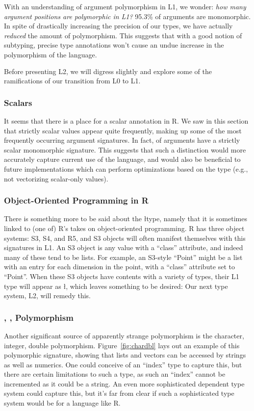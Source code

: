 \documentclass[acmsmall,10pt,review,anonymous]{acmart}\settopmatter{printfolios=true,printccs=false,printacmref=false}
\begin{document}
With an understanding of argument polymorphism in L1, we wonder: {\it how
  many argument positions are polymorphic in L1?}  95.3\% of arguments are
monomorphic.  In spite of drastically increasing the precision of our types,
we have actually {\it reduced} the amount of polymorphism.  This suggests
that with a good notion of subtyping, precise type annotations won't cause
an undue increase in the polymorphism of the language.

Before presenting L2, we will digress slightly and explore some of the ramifications of our transition from L0 to L1.

%
%
\subsubsection{Scalars}\label{sec:scalars}

It seems that there is a place for a scalar annotation in R.  We saw in this
section that strictly scalar values appear quite frequently, making up some
of the most frequently occurring argument signatures.  In fact,
\PERCSCALARMONO of arguments have a strictly scalar monomorphic signature.
This suggests that such a distinction would more accurately capture current
use of the language, and would also be beneficial to future implementations
which can perform optimizations based on the type (e.g., not vectorizing
scalar-only values).

%
%
\subsubsection{Object-Oriented Programming in R}
\label{sec:S3S4R5}

There is something more to be said about the \l type, namely that it is
sometimes linked to (one of) R's takes on object-oriented programming.  R
has three object systems: S3, S4, and R5, and S3 objects will often manifest
themselves with this signatures in L1.  An S3 object is any value with a
``class'' attribute, and indeed many of these tend to be lists.  For
example, an S3-style ``Point'' might be a list with an entry for each
dimension in the point, with a ``class'' attribute set to ``Point''.  When
these S3 objects have contents with a variety of types, their L1 type will
appear as \l, which leaves something to be desired: Our next type system,
L2, will remedy this.

%
%
\subsubsection{\C, \I, \D Polymorphism}
Another significant source of apparently strange polymorphism is the
character, integer, double polymorphism.  Figure~\ref{fig:chardbl} lays out
an example of this polymorphic signature, showing that lists and vectors can
be accessed by strings as well as numerics.  One could conceive of an
``index'' type to capture this, but there are certain limitations to such a
type, as such an ``index'' cannot be incremented as it could be a string.
An even more sophisticated dependent type system could capture this, but
it's far from clear if such a sophisticated type system would be for a
language like R.
\end{document}
